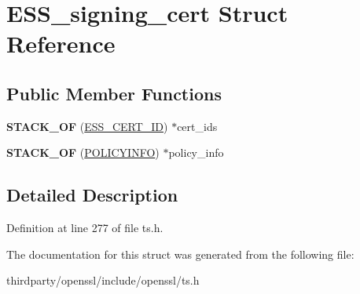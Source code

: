 \hypertarget{struct_e_s_s__signing__cert}{}\section{E\+S\+S\+\_\+signing\+\_\+cert Struct Reference}
\label{struct_e_s_s__signing__cert}
\subsection*{Public Member Functions}
\begin{DoxyCompactItemize}
\item 
\mbox{\label{struct_e_s_s__signing__cert_a9d02849ef4a7fb6c6e1b80af67af826e}} 
{\bfseries S\+T\+A\+C\+K\+\_\+\+OF} (\hyperlink{struct_e_s_s__cert__id}{E\+S\+S\+\_\+\+C\+E\+R\+T\+\_\+\+ID}) $\ast$cert\+\_\+ids
\item 
\mbox{\label{struct_e_s_s__signing__cert_a6ae86b6dc193da0e12852f312547ef5d}} 
{\bfseries S\+T\+A\+C\+K\+\_\+\+OF} (\hyperlink{struct_p_o_l_i_c_y_i_n_f_o__st}{P\+O\+L\+I\+C\+Y\+I\+N\+FO}) $\ast$policy\+\_\+info
\end{DoxyCompactItemize}


\subsection{Detailed Description}


Definition at line 277 of file ts.\+h.



The documentation for this struct was generated from the following file\+:\begin{DoxyCompactItemize}
\item 
thirdparty/openssl/include/openssl/ts.\+h\end{DoxyCompactItemize}
